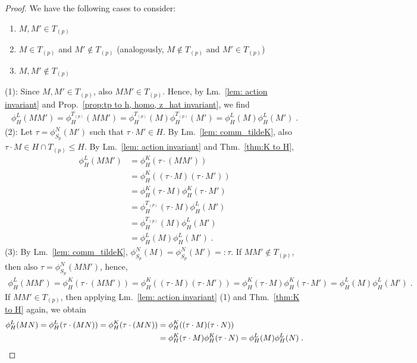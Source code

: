 \documentclass[aps,pra,letterpaper,onrcolumn,nofootinbib,notitlepage,longbibliography]{revtex4-1}
\begin{document}
\begin{proof}
    We have the following cases to consider:
    \begin{enumerate}
    \item $M,M'\in T_{(p)}$
    \item $M\in T_{(p)}$ and $M'\not\in T_{(p)}$ (analogously, $M\not\in T_{(p)}$ and $M'\in T_{(p)}$)
    \item $M,M'\not\in T_{(p)}$
    \end{enumerate}
    (1): Since $M,M'\in T_{(p)}$, also $MM'\in T_{(p)}$. Hence, by Lm.~\ref{lem: action invariant} and Prop.~\ref{prop:tp to h, homo, z_hat invariant}, we find
    \begin{align*}
        \phi^L_H(MM')
        =\phi^{T_{(p)}}_H(MM')
        =\phi^{T_{(p)}}_H(M)\phi^{T_{(p)}}_H(M')
        =\phi^L_H(M)\phi^L_H(M')\; .
    \end{align*}
    (2): Let $\tau=\phi^N_{S_p}(M')$ such that $\tau\cdot M'\in H$. By Lm.~\ref{lem: comm_tildeK}, also $\tau\cdot M\in H\cap T_{(p)}\leq H$. By Lm.~\ref{lem: action invariant} and Thm.~\ref{thm:K to H},
    \begin{align*}
        \phi^L_H(MM')
        &=\phi^K_H(\tau\cdot (MM'))\\
        &=\phi^K_H((\tau\cdot M)(\tau\cdot M'))\\
        &=\phi^K_H(\tau\cdot M)\phi^K_H(\tau\cdot M')\\
        &=\phi^{T_{(p)}}_H(\tau\cdot M)\phi^L_H(M')\\
        &=\phi^{T_{(p)}}_H(M)\phi^L_H(M')\\
        &=\phi^L_H(M)\phi^L_H(M')\; .
    \end{align*}
    (3): By Lm.~\ref{lem: comm_tildeK}, $\phi^N_{S_p}(M)=\phi^N_{S_p}(M')=:\tau$. If $MM'\not\in T_{(p)}$, then also $\tau=\phi^N_{S_p}(MM')$, hence,
    \begin{align*}
        \phi^L_H(MM')
        =\phi^K_H(\tau\cdot(MM'))=\phi^K_H((\tau\cdot M)(\tau\cdot M'))
        =\phi^K_H(\tau\cdot M)\phi^K_H(\tau\cdot M')
        =\phi^L_H(M)\phi^L_H(M')\; .
    \end{align*}
    If $MM'\in T_{(p)}$, then applying Lm.~\ref{lem: action invariant} (1) and Thm.~\ref{thm:K to H} again, we obtain
    \begin{align*}
        \phi^L_H(MN)
        =\phi^L_H(\tau\cdot (MN))
        =\phi^K_H(\tau\cdot (MN))
        &=\phi^K_H((\tau\cdot M)(\tau\cdot N))\\
        &=\phi^K_H(\tau\cdot M)\phi^K_H(\tau\cdot N)
        =\phi^L_H(M)\phi^L_H(N)\; .\qedhere
    \end{align*}
\end{proof}
\end{document}
